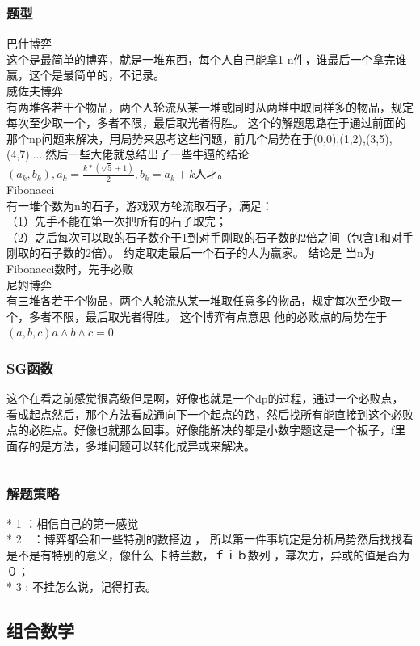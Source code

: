 \documentclass[a4paper,11pt]{article}
\begin{document}
\begin{CJK}{UTF8}{gbsn}
\subsubsection{题型}
巴什博弈\\
这个是最简单的博弈，就是一堆东西，每个人自己能拿1-n件，谁最后一个拿完谁赢，这个是最简单的，不记录。
\\威佐夫博弈\\
有两堆各若干个物品，两个人轮流从某一堆或同时从两堆中取同样多的物品，规定每次至少取一个，多者不限，最后取光者得胜。
这个的解题思路在于通过前面的那个np问题来解决，用局势来思考这些问题，前几个局势在于(0,0),(1,2),(3,5),(4,7).....然后一些大佬就总结出了一些牛逼的结论$( a_k,b_k),a_k=\frac{k*(\sqrt{5}+1)}{2} , b_k=a_k+k$人才。
\\Fibonacci\\
有一堆个数为n的石子，游戏双方轮流取石子，满足：
\\（1）先手不能在第一次把所有的石子取完；
\\（2）之后每次可以取的石子数介于1到对手刚取的石子数的2倍之间（包含1和对手刚取的石子数的2倍）。 约定取走最后一个石子的人为赢家。
结论是 当n为Fibonacci数时，先手必败
\\尼姆博弈\\
有三堆各若干个物品，两个人轮流从某一堆取任意多的物品，规定每次至少取一个，多者不限，最后取光者得胜。
这个博弈有点意思 他的必败点的局势在于$(a,b,c) a \land {b \land c} = 0$
\subsubsection{SG函数}
这个在看之前感觉很高级但是啊，好像也就是一个dp的过程，通过一个必败点，看成起点然后，那个方法看成通向下一个起点的路，然后找所有能直接到这个必败点的必胜点。好像也就那么回事。好像能解决的都是小数字题这是一个板子，f里面存的是方法，多堆问题可以转化成异或来解决。
\inputminted{c++}{../scoure/math/boyi.cpp}
\subsubsection{解题策略}
* 1  ：相信自己的第一感觉\\
* 2　：博弈都会和一些特别的数搭边 ， 所以第一件事坑定是分析局势然后找找看是不是有特别的意义，像什么 卡特兰数，ｆｉｂ数列 ，幂次方，异或的值是否为０；\\
* 3  : 不挂怎么说，记得打表。\\
\subsection{组合数学}

\end{CJK}
\end{document}
